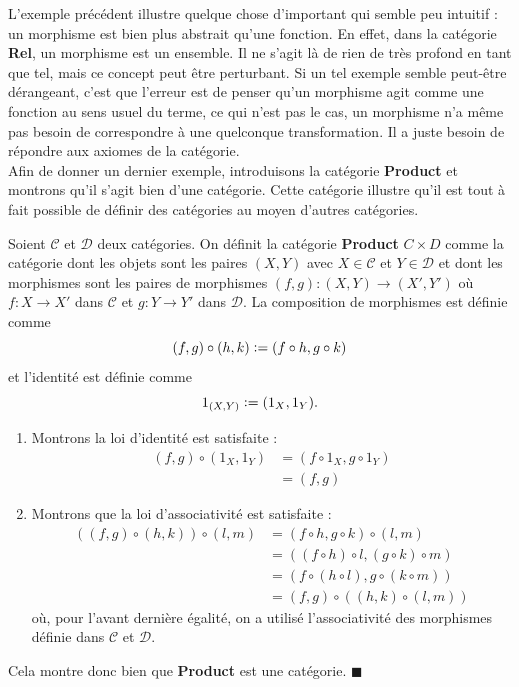 \documentclass{article}
\begin{document}
L'exemple précédent illustre quelque chose d'important qui semble peu intuitif : un morphisme est bien plus abstrait qu'une fonction. En effet, dans la catégorie \textbf{Rel}, un morphisme est un ensemble. Il ne s'agit là de rien de très profond en tant que tel, mais ce concept peut être perturbant. Si un tel exemple semble peut-être dérangeant, c'est que l'erreur est de penser qu'un morphisme agit comme une fonction au sens usuel du terme, ce qui n'est pas le cas, un morphisme n'a même pas besoin de correspondre à une quelconque transformation. Il a juste besoin de répondre aux axiomes de la catégorie.\\

Afin de donner un dernier exemple, introduisons la catégorie \textbf{Product} et montrons qu'il s'agit bien d'une catégorie. Cette catégorie illustre qu'il est tout à fait possible de définir des catégories au moyen d'autres catégories.

\begin{example}[Product]{}
    Soient $\mathcal C$ et $\mathcal D$ deux catégories. On définit la catégorie \textbf{Product} $C\times D$ comme la catégorie dont les objets sont les paires $(X, Y)$ avec $X\in\mathcal C$ et $Y\in\mathcal D$ et dont les morphismes sont les paires de morphismes $(f, g):(X, Y)\to(X', Y')$ où $f:X\to X'$ dans $\mathcal C$ et $g:Y\to Y'$ dans $\mathcal D$. La composition de morphismes est définie comme
    $$
    (f, g)\circ(h, k)\vcentcolon=(f\circ h, g\circ k)
    $$
    et l'identité est définie comme
    $$
    1_{(X, Y)}\vcentcolon=(1_X, 1_Y).
    $$
    \begin{enumerate}
        \item Montrons la loi d'identité est satisfaite :
            \begin{equation*}
            \begin{aligned}
                (f, g)\circ(1_X, 1_Y) &= (f\circ1_X, g\circ 1_Y)\\
                                      &= (f, g)
            \end{aligned}
            \end{equation*}
        \item Montrons que la loi d'associativité est satisfaite :
            \begin{equation*}
            \begin{aligned}
                ((f, g)\circ(h, k))\circ(l, m) &= (f\circ h, g\circ k)\circ (l, m)\\
                                               &= ((f\circ h)\circ l, (g\circ k)\circ m)\\
                                               &= (f\circ(h\circ l), g\circ(k\circ m))\\
                                               &= (f, g)\circ((h, k)\circ(l, m))
            \end{aligned}
            \end{equation*}
            où, pour l'avant dernière égalité, on a utilisé l'associativité des morphismes définie dans $\mathcal C$ et $\mathcal D$.
    \end{enumerate}
    Cela montre donc bien que \textbf{Product} est une catégorie. $\blacksquare$
\end{example}
\end{document}
